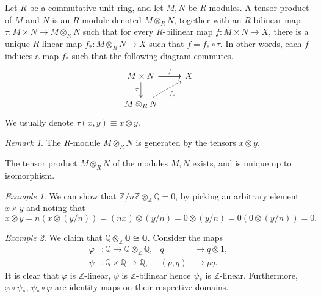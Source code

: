\documentclass[11pt]{article}
\newcommand{\Q}{\mathbb{Q}}
\newcommand{\Z}{\mathbb{Z}}
\theoremstyle{definition}
\theoremstyle{remark}
\newtheorem*{remark}{Remark}
\newtheorem*{example}{Example}
\numberwithin{equation}{section}
\begin{document}
    \begin{definition}
        Let $R$ be a commutative unit ring, and let $M, N$ be $R$-modules. A tensor
        product of $M$ and $N$ is an $R$-module denoted $M\otimes_R N$, together with
        an $R$-bilinear map $\tau\colon M\times N \to M\otimes_R N$ such that for
        every $R$-bilinear map $f\colon M \times N \to X$, there is a unique
        $R$-linear map $f_*\colon M\otimes_R N \to X$ such that $f = f_*\circ \tau$.
        In other words, each $f$ induces a map $f_*$ such that the following diagram
        commutes. \[
            \begin{tikzcd}
                {M\times N} & X \\
                {M\otimes_R N}
                \arrow[from=1-1, to=1-2]
                \arrow["f", from=1-1, to=1-2]
                \arrow["\tau"', from=1-1, to=2-1]
                \arrow["{f_*}"', dashed, from=2-1, to=1-2]
            \end{tikzcd}
        \] We usually denote $\tau(x, y) \equiv x\otimes y$.

        \begin{remark}
            The $R$-module $M\otimes_R N$ is generated by the tensors $x\otimes y$.
        \end{remark}
    \end{definition}

    \begin{theorem}
        The tensor product $M\otimes_R N$ of the modules $M, N$ exists, and is unique
        up to isomorphism.
    \end{theorem}

    \begin{example}
        We can show that $\Z/n\Z \otimes_\Z \Q = 0$, by picking an arbitrary element
        $x\times y$ and noting that \[
            x\otimes y = n(x\otimes (y / n)) = (nx) \otimes (y / n) = 0\otimes (y /
            n) = 0(0\otimes (y / n)) = 0.
        \]
    \end{example}

    \begin{example}
        We claim that $\Q\otimes_\Z \Q \cong \Q$. Consider the maps \begin{align*}
            \varphi&\colon \Q \to \Q\otimes_\Z \Q, &q&\mapsto q\otimes 1, \\
            \psi&\colon \Q\times \Q \to \Q, &(p, q)&\mapsto pq.
        \end{align*}
        It is clear that $\varphi$ is $\Z$-linear, $\psi$ is $\Z$-bilinear hence
        $\psi_*$ is $\Z$-linear. Furthermore, $\varphi\circ \psi_*$, $\psi_*\circ
        \varphi$ are identity maps on their respective domains.
    \end{example}
\end{document}
